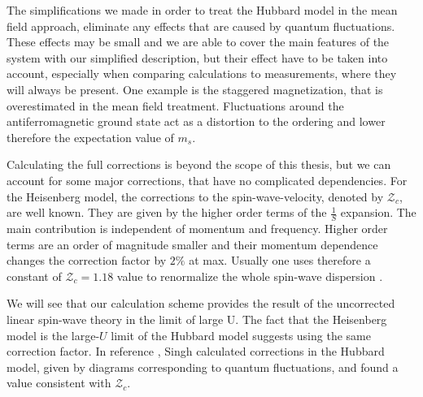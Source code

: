 The simplifications we made in order to treat the Hubbard model in the mean field approach,  
eliminate any effects that are caused by quantum fluctuations.
These effects may be small and we are able to cover the main features of the system with our simplified description,
but their effect have to be taken into account, especially when comparing calculations to measurements, where they will always be present.
One example is the staggered magnetization, that is overestimated in the mean field treatment. 
Fluctuations around the antiferromagnetic ground state act as a distortion to the ordering and lower therefore the expectation value of $m_s$.


Calculating the full corrections is beyond the scope of this thesis, but we can account for some major corrections, that have no complicated dependencies.
For the Heisenberg model, the corrections to the spin-wave-velocity, denoted by $\mathcal{Z}_c$, are well known.
They are given by the higher order terms of the $\frac1S$ expansion. 
The main contribution is independent of momentum and frequency. 
Higher order terms are an order of magnitude smaller and their momentum dependence changes the correction factor by $2\%$ at max.
Usually one uses therefore a constant of $\mathcal{Z}_c=1.18$ value to renormalize the whole spin-wave dispersion \cite{PhysRevB.45.10131}.

We will see that our calculation scheme provides the result of the uncorrected linear spin-wave theory in the limit of large U. 
The fact that the Heisenberg model is the large-$U$ limit of the Hubbard model suggests using the same correction factor.
In reference \cite{PhysRevB.43.3617}, Singh calculated corrections in the Hubbard model, 
given by diagrams corresponding to quantum fluctuations,
and found a value consistent with $\mathcal{Z}_c$.







 